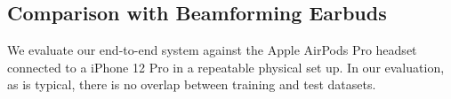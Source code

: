 \documentclass [11pt, proquest] {uwthesis}[2020/02/24]
\begin{document}
\subsection{Comparison with  Beamforming Earbuds} \label{sec:endtoend}

 We  evaluate our end-to-end system against the Apple AirPods Pro headset connected to a  iPhone 12 Pro in a repeatable physical set up. In our evaluation, as is typical, there is  no overlap between training and test datasets. 








\end{document}
